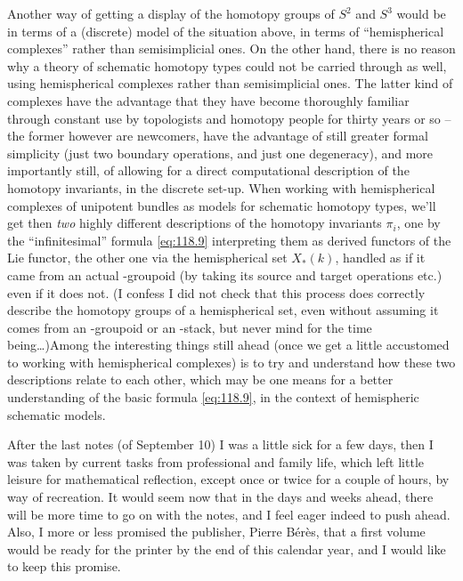 Another way of getting a display of the homotopy groups of $S^2$ and
$S^3$ would be in terms of a (discrete) model of the situation above,
in terms of ``hemispherical complexes'' rather than semisimplicial
ones. On the other hand, there is no reason why a theory of schematic
homotopy types could not be carried through as well, using
hemispherical complexes rather than semisimplicial ones. The latter
kind of complexes have the advantage that they have
become thoroughly familiar through constant use
by topologists and homotopy people for thirty years or so -- the
former however are newcomers, have the advantage of still greater
formal simplicity (just two boundary operations, and just one
degeneracy), and more importantly still, of allowing for a direct
computational description of the homotopy invariants, in the discrete
set-up. When working with hemispherical complexes of unipotent bundles
as models for schematic homotopy types, we'll get then \emph{two}
highly different descriptions of the homotopy invariants $\pi_i$, one
by the ``infinitesimal'' formula \eqref{eq:118.9} interpreting them as
derived functors of the Lie functor, the other one via the
hemispherical set $X_*(k)$, handled as if it came from an actual
\oo-groupoid (by taking its source and target operations etc.) even if
it does not. (I confess I did not check that this process does
correctly describe the homotopy groups of a hemispherical set, even
without assuming it comes from an \oo-groupoid or an \oo-stack, but
never mind for the time being\dots)\enspace Among the interesting
things still ahead (once we get a little accustomed to working with
hemispherical complexes) is to try and understand how these two
descriptions relate to each other, which may be one means for a better
understanding of the basic formula \eqref{eq:118.9}, in the context of
hemispheric schematic models.

\bigbreak

\presectionfill{}\par

\label{sec:119}%
After the last notes (of September 10) I was a little sick for a few
days, then I was taken by current tasks from professional and family
life, which left little leisure for mathematical reflection, except
once or twice for a couple of hours, by way of recreation. It would
seem now that in the days and weeks ahead, there will be more time to
go on with the notes, and I feel eager indeed to push ahead. Also, I
more or less promised the publisher, Pierre Bérès, that a first volume
would be ready for the printer by the end of this calendar year, and I
would like to keep this promise.

